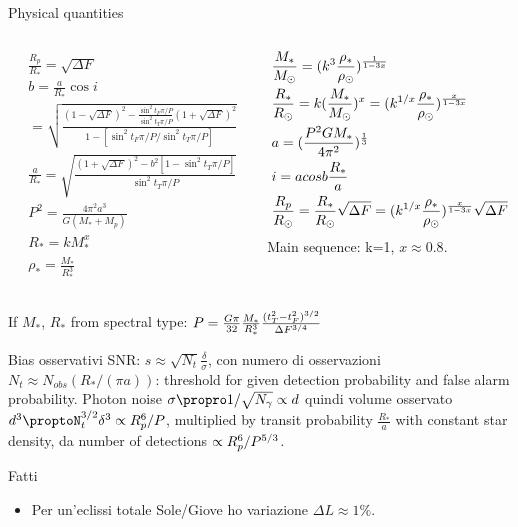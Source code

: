 \begin{frame}{Physical quantities}
\begin{columns}[T]
\begin{column}{0.5\textwidth}
\begin{align*}
&\frac{R_p}{R_*}=\sqrt{\Delta F}\\
&b=\frac{a}{R_*}\cos{i}\\
&=\sqrt{\frac{(1-\sqrt{\Delta F})^2-\frac{\sin^2{t_F\pi/P}}{\sin^2{t_T\pi/P}}(1+\sqrt{\Delta F})^2}{1-[\sin^2{t_F\pi/P}/\sin^2{t_T\pi/P}]}}\\
&\frac{a}{R_*}=\sqrt{\frac{(1+\sqrt{\Delta F})^2-b^2[1-\sin^2{t_T\pi/P}]}{\sin^2{t_T\pi/P}}}\\
&P^2=\frac{4\pi^2 a^3}{G(M_*+M_p)}\\
&R_*=kM_*^x\\
&\rho_*=\frac{M_*}{R_*^3}
\end{align*}
\end{column}
\begin{column}{0.5\textwidth}
\begin{align*}
&\frac{M_*}{M_{\odot}{}}=(k^3\frac{\rho_*}{\rho_{\odot}})^{\frac{1}{1-3x}}\\
&\frac{R_*}{R_{\odot}{}}=k(\frac{M_*}{M_{\odot}{}})^x=(k^{1/x}\frac{\rho_*}{\rho_{\odot}})^{\frac{x}{1-3x}}\\
&a=(\frac{P^2GM_*}{4\pi^2})^{\frac{1}{3}}\\
&i=acos{b\frac{R_*}{a}}\\
&\frac{R_p}{R_{\odot}{}}=\frac{R_*}{R_{\odot}{}}\sqrt{\Delta F}=(k^{1/x}\frac{\rho_*}{\rho_{\odot}})^{\frac{x}{1-3x}}\sqrt{\Delta F}
\end{align*}
Main sequence: k=1, $x\approx0.8$.
\end{column}\end{columns}
If $M_*$, $R_*$ from spectral type: $P=\frac{G\pi}{32}\frac{M_*}{R_*^3}\frac{(t_T^2-t_F^2)^{3/2}}{\Delta F^{3/4}}$
\end{frame}

\begin{frame}{Bias osservativi}
SNR: $s\approx\sqrt{N_t}\frac{\delta}{\sigma}$, con numero di osservazioni $N_t\approx N_{obs}(R_*/(\pi a))$: threshold for given detection probability and false alarm probability. Photon noise $\sigma\propro1/\sqrt{N_{\gamma}}\propto d$ quindi volume osservato $d^3\proptoN_t\expy{3/2}\delta^3\propto R_p^6/P$, multiplied by transit probability  $\frac{R_*}{a}$ with constant star density, da number of detections $\propto R_p^6/P^{5/3}$.
\end{frame} 

\begin{wordonframe}{Fatti}
\begin{itemize}
    \item Per un'eclissi totale Sole/Giove ho variazione $\Delta L\approx1\%$.
\end{itemize}
\end{wordonframe}
